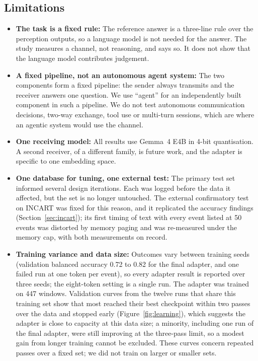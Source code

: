 \begin{table}[t]
\caption{Bytes a sensor would transmit per window (median over the test windows, 8-byte header included) and time at 10~kbit/s for 50 events. Latent: the 35-dimensional per-event input of the adapter. Binary fields: label, confidence (16-bit), run length and signal quality, 5 bytes per event, rendered as text at the hub. Protocol overhead and radio energy are not modelled.}
\label{tab:bandwidth}
\centering
\footnotesize

\end{table}

\subsection{Limitations}
\begin{itemize}
\item \textbf{The task is a fixed rule:} The reference answer is a three-line rule over the perception outputs, so a language model is not needed for the answer. The study measures a channel, not reasoning, and says so. It does not show that the language model contributes judgement.
\item \textbf{A fixed pipeline, not an autonomous agent system:} The two components form a fixed pipeline: the sender always transmits and the receiver answers one question. We use ``agent'' for an independently built component in such a pipeline. We do not test autonomous communication decisions, two-way exchange, tool use or multi-turn sessions, which are where an agentic system would use the channel.
\item \textbf{One receiving model:} All results use Gemma~4 E4B in 4-bit quantisation. A second receiver, of a different family, is future work, and the adapter is specific to one embedding space.
\item \textbf{One database for tuning, one external test:} The primary test set informed several design iterations. Each was logged before the data it affected, but the set is no longer untouched. The external confirmatory test on INCART was fixed for this reason, and it replicated the accuracy findings (Section~\ref{sec:incart}); its first timing of text with every event listed at 50 events was distorted by memory paging and was re-measured under the memory cap, with both measurements on record.
\item \textbf{Training variance and data size:} Outcomes vary between training seeds (validation balanced accuracy 0.72 to 0.82 for the final adapter, and one failed run at one token per event), so every adapter result is reported over three seeds; the eight-token setting is a single run. The adapter was trained on 447 windows. Validation curves from the twelve runs that share this training set show that most reached their best checkpoint within two passes over the data and stopped early (Figure~\ref{fig:learning}), which suggests the adapter is close to capacity at this data size; a minority, including one run of the final adapter, were still improving at the three-pass limit, so a modest gain from longer training cannot be excluded. These curves concern repeated passes over a fixed set; we did not train on larger or smaller sets.

\end{itemize}
